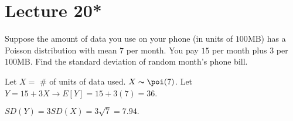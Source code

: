 \section{Lecture 20*}

Suppose the amount of data you use on your phone (in units of $ 100 $MB) has
a Poisson distribution with mean $ 7 $ per month. You pay $ 15 $ per
month plus $ 3 $ per $ 100 $MB. Find the standard deviation of random
month's phone bill.

Let $ X= $ \# of units of data used. $ X \thicksim \poi(7) $. Let
$ Y=15+3X\rightarrow E[Y]=15+3(7)=36 $. 

$ SD(Y)=3SD(X)=3\sqrt{7}=7.94. $